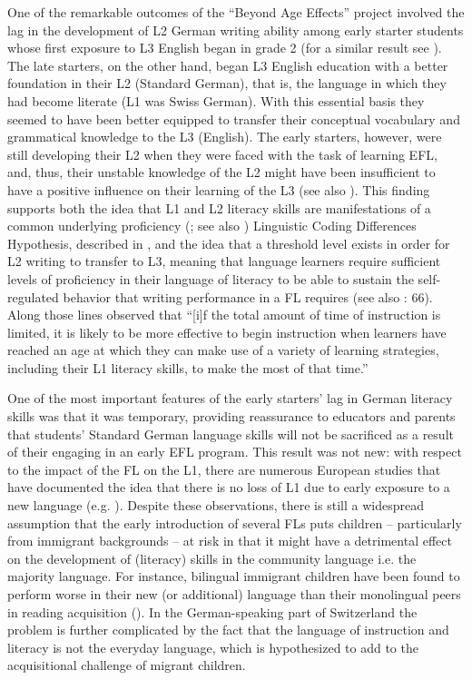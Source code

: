 \documentclass[output=paper,modfonts,nonflat,newtxmath]{langsci/langscibook}
\begin{document}
One of the remarkable outcomes of the “Beyond Age Effects” project involved the lag in the development of L2 German writing ability among early starter students whose first exposure to L3 English began in grade 2 (for a similar result see \citealt{Genesee2004}). The late starters, on the other hand, began L3 English education with a better foundation in their L2 (Standard German), that is, the language in which they had become literate (L1 was Swiss German). With this essential basis they seemed to have been better equipped to transfer their conceptual vocabulary and grammatical knowledge to the L3 (English). The early starters, however, were still developing their L2 when they were faced with the task of learning EFL, and, thus, their unstable knowledge of the L2 might have been insufficient to have a positive influence on their learning of the L3 (see also \citealt{Sánchez2012, Sánchez2015}). This finding supports both the idea that L1 and L2 literacy skills are manifestations of a common underlying proficiency (\citealt{Cummins1976, Cummins1981}; see also ) Linguistic Coding Differences Hypothesis, described in \citet{Sparks2012}, and the idea that  a threshold level exists in order for L2 writing to transfer to L3, meaning that language learners require sufficient levels of proficiency in their language of literacy to be able to sustain the self-regulated behavior that writing performance in a FL requires (see also \citealt{SchoonenEtAl2011}: 66). Along those lines \citet[449]{Lightbown2000} observed that “[i]f the total amount of time of instruction is limited, it is likely to be more effective to begin instruction when learners have reached an age at which they can make use of a variety of learning strategies, including their L1 literacy skills, to make the most of that time.”

One of the most important features of the early starters’ lag in German literacy skills was that it was temporary, providing reassurance to educators and parents that students’ Standard German language skills will not be sacrificed as a result of their engaging in an early EFL program. This result was not new: with respect to the impact of the FL on the L1, there are numerous European studies that have documented the idea that there is no loss of L1 due to early exposure to a new language (e.g. \citealt{Goorhuis-BrouwerDeBot2010}). Despite these observations, there is still a widespread assumption that the early introduction of several FLs puts children – particularly from immigrant backgrounds – at risk in that it might have a detrimental effect on the development of (literacy) skills in the community language i.e. the majority language. For instance, bilingual immigrant children have been found to perform worse in their new (or additional) language than their monolingual peers in reading acquisition (\citealt{AugustHakuta1997, SlavinCheung2003}). In the German-speaking part of Switzerland the problem is further complicated by the fact that the language of instruction and literacy is not the everyday language, which is hypothesized to add to the acquisitional challenge of migrant children.
\end{document}
